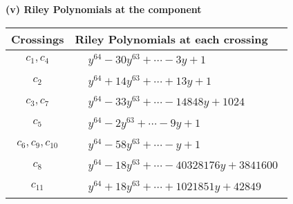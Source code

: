 \documentclass[1p]{elsarticle_modified}
\theoremstyle{definition}
\begin{document}
\newpage\renewcommand{\arraystretch}{1}
\flushleft \textbf{(v) Riley Polynomials at the component}\newline \\
\begin{tabular}{m{50pt}|m{274pt}}
Crossings & \hspace{64pt}Riley Polynomials at each crossing \\
\hline $$\begin{aligned}c_{1},c_{4}\end{aligned}$$&$\begin{aligned}
&y^{64}-30 y^{63}+\cdots-3 y+1
\end{aligned}$\\
\hline $$\begin{aligned}c_{2}\end{aligned}$$&$\begin{aligned}
&y^{64}+14 y^{63}+\cdots+13 y+1
\end{aligned}$\\
\hline $$\begin{aligned}c_{3},c_{7}\end{aligned}$$&$\begin{aligned}
&y^{64}-33 y^{63}+\cdots-14848 y+1024
\end{aligned}$\\
\hline $$\begin{aligned}c_{5}\end{aligned}$$&$\begin{aligned}
&y^{64}-2 y^{63}+\cdots-9 y+1
\end{aligned}$\\
\hline $$\begin{aligned}c_{6},c_{9},c_{10}\end{aligned}$$&$\begin{aligned}
&y^{64}-58 y^{63}+\cdots- y+1
\end{aligned}$\\
\hline $$\begin{aligned}c_{8}\end{aligned}$$&$\begin{aligned}
&y^{64}-18 y^{63}+\cdots-40328176 y+3841600
\end{aligned}$\\
\hline $$\begin{aligned}c_{11}\end{aligned}$$&$\begin{aligned}
&y^{64}+18 y^{63}+\cdots+1021851 y+42849
\end{aligned}$\\
\hline
\end{tabular}\\~\\
\end{document}
